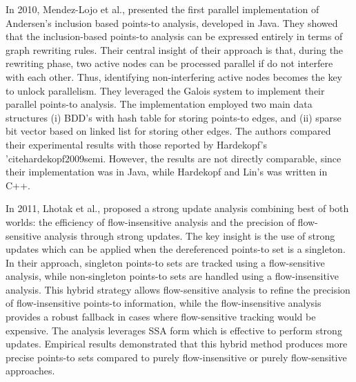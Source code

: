 In 2010, Mendez-Lojo et al., \cite{mendez2010parallel} presented the first parallel implementation of Andersen's inclusion based points-to analysis, developed in Java. 
They showed that the inclusion-based points-to analysis can be expressed entirely in terms of graph rewriting rules.
Their central insight of their approach is that, during the rewriting phase, two active nodes can be processed parallel if do not interfere with each other.
Thus, identifying non-interfering active nodes becomes the key to unlock parallelism.
They leveraged the Galois system \cite{galois} to implement their parallel points-to analysis.
The implementation employed two main data structures (i) BDD's with hash table for storing points-to edges, and (ii) sparse bit vector based on linked list for storing other edges. 
The authors compared their experimental results with those reported by Hardekopf's 'cite{hardekopf2009semi}.
However, the results are not directly comparable, since their implementation was in Java, while Hardekopf and Lin’s was written in C++.



In 2011, Lhotak et al., \cite{lhotak2011points} proposed a strong update analysis combining best of both worlds: the efficiency of flow-insensitive analysis and the precision of flow-sensitive analysis through strong updates.
The key insight is the use of strong updates which can be applied when the dereferenced points-to set is a singleton. 
In their approach, singleton points-to sets are tracked using a flow-sensitive analysis, while non-singleton points-to sets are handled using a flow-insensitive analysis.
This hybrid strategy allows flow-sensitive analysis to refine the precision of flow-insensitive points-to information, while the flow-insensitive analysis provides a robust fallback in cases where flow-sensitive tracking would be expensive.
The analysis leverages SSA form which is effective to perform strong updates. Empirical results demonstrated that this hybrid method produces more precise points-to sets compared to purely flow-insensitive or purely flow-sensitive approaches.